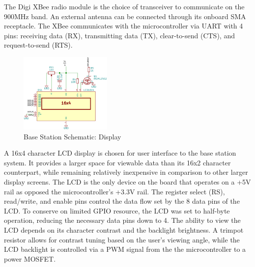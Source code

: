 \documentclass[journal,compsoc]{IEEEtran}
\begin{document}
The Digi XBee radio module is the choice of transceiver to communicate on the 900MHz band. An external antenna can be connected through its onboard SMA receptacle. The XBee communicates with the microcontroller via UART with 4 pins: receiving data (RX), transmitting data (TX), clear-to-send (CTS), and request-to-send (RTS).

\begin{figure}[ht] 	%
\centering
\includegraphics[width=0.4\textwidth]{base-schematic-lcd.png}
\caption{ \space Base Station Schematic: Display}
\label{base-sch-lcd}
\end{figure}

A 16x4 character LCD display is chosen for user interface to the base station system. It provides a larger space for viewable data than its 16x2 character counterpart, while remaining relatively inexpensive in comparison to other larger display screens. The LCD is the only device on the board that operates on a +5V rail as opposed the microcontroller's +3.3V rail. The register select (RS), read/write, and enable pins control the data flow set by the 8 data pins of the LCD. To conserve on limited GPIO resource, the LCD was set to half-byte operation, reducing the necessary data pins down to 4. The ability to view the LCD depends on its character contrast and the backlight brightness. A trimpot resistor allows for contrast tuning based on the user's viewing angle, while the LCD backlight is controlled via a PWM signal from the the microcontroller to a power MOSFET.
\end{document}
